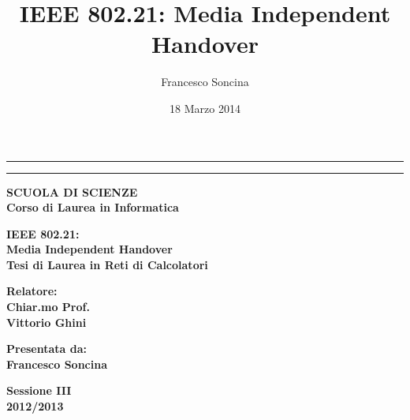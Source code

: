 \documentclass [a4paper,12pt]{book}
\title{IEEE 802.21: Media Independent Handover}
\author{Francesco Soncina}
\date{18 Marzo 2014}
\begin{document}
\begin{titlepage}
\thispagestyle{empty}
\begin{center}
\rule[0.1cm]{13.3cm}{0.1mm}
\rule[0.5cm]{13.3cm}{0.6mm}
{\small{\bf SCUOLA DI SCIENZE\\
Corso di Laurea in Informatica }}
\end{center}
\vspace{15mm}
\begin{center}
{\LARGE{\bf IEEE 802.21:}}\\
\vspace{3mm}
{\LARGE{\bf Media Independent Handover}}\\
\vspace{19mm} {\large{\bf Tesi di Laurea in Reti di Calcolatori}}
\end{center}
\vspace{40mm}
\par
\noindent
\begin{minipage}[t]{0.47\textwidth}
{\large{\bf Relatore:\\
Chiar.mo Prof.\\
Vittorio Ghini}}
\end{minipage}
\hfill
\begin{minipage}[t]{0.47\textwidth}\raggedleft
{\large{\bf Presentata da:\\
Francesco Soncina}}
\end{minipage}
\vspace{20mm}
\begin{center}
{\large{\bf Sessione III\\%
2012/2013 }}%
\end{center}
\end{titlepage}
\frontmatter
%
\maketitle
\pagestyle{fancy}


\tableofcontents
\pagestyle{empty}
\listoffigures
\listoftables
\mainmatter
\pagestyle{fancy}







\end{document}
